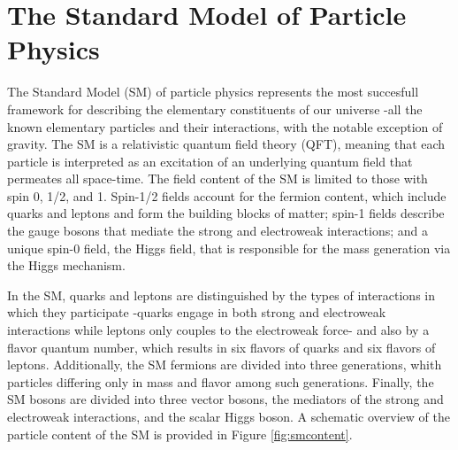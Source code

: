 
\chapter{The Standard Model of Particle Physics}
\label{chap:theory}

The Standard Model (SM) of particle physics represents the most succesfull framework for describing the elementary constituents of our universe -all the known elementary particles and their interactions, with the notable exception of gravity. The SM is a relativistic quantum field theory (QFT), meaning that each particle is interpreted as an excitation of an underlying quantum field that permeates all space-time. The field content of the SM is limited to those with spin 0, 1/2, and 1. Spin-1/2 fields account for the fermion content, which include quarks and leptons and form the building blocks of matter; spin-1 fields describe the gauge bosons that mediate the strong and electroweak interactions; and a unique spin-0 field, the Higgs field, that is responsible for the mass generation via the Higgs mechanism. 

In the SM, quarks and leptons are distinguished by the types of interactions in which they participate -quarks engage in both strong and electroweak interactions while leptons only couples to the electroweak force- and also by a flavor quantum number, which results in six flavors of quarks and six flavors of leptons. Additionally, the SM fermions are divided into three generations, whith particles differing only in mass and flavor among such generations. Finally, the SM bosons are divided into three vector bosons, the mediators of the strong and electroweak interactions, and the scalar Higgs boson. A schematic overview of the particle content of the SM is provided in Figure \ref{fig:smcontent}.

